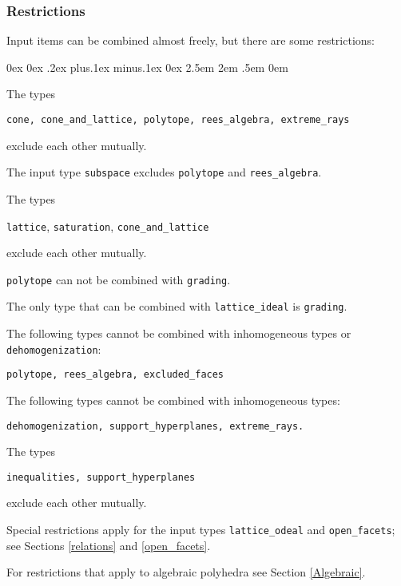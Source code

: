\documentclass[12pt,a4paper]{scrartcl}
\newcounter{listi}
\newcommand{\stdli}{ \topsep0ex \partopsep0ex %
\parsep.2ex plus.1ex minus.1ex \itemsep0ex%
\leftmargin2.5em \labelwidth2em \labelsep.5em \rightmargin0em}%
\newenvironment{arab}{\begin{list}{\textup{(\arabic{listi})}}%
	{\usecounter{listi}\stdli}}{\end{list}}
\theoremstyle{definition}
\def\ttt{\texttt}
\begin{document}
\subsubsection{Restrictions}

Input items can be combined almost freely, but there are some restrictions:

\begin{arab}
	\item The types
	\begin{center}
		\ttt {cone, cone\_and\_lattice, polytope, rees\_algebra, extreme\_rays}	
	\end{center}
	exclude each other mutually.
	\item The input type \verb|subspace| excludes \verb|polytope| and \verb|rees_algebra|.
	\item The types
	\begin{center}
		\ttt {lattice}, \ttt{saturation}, \ttt{cone\_and\_lattice}	
	\end{center}
	exclude each other mutually.
	\item \verb|polytope| can not be combined with \verb|grading|.
	\item The only type that can be combined with \ttt{lattice\_ideal} is \ttt{grading}.
	\item The following types cannot be combined with inhomogeneous types or \verb|dehomogenization|:
	\begin{center}
		\ttt{polytope, rees\_algebra, excluded\_faces}
	\end{center}
	\item The following types cannot be combined with inhomogeneous types:
	\begin{center}
		\ttt{dehomogenization, support\_hyperplanes, extreme\_rays.}
	\end{center}

\item The types
\begin{center}
	\ttt{inequalities, support\_hyperplanes}
\end{center}
exclude each other mutually.
	
	\item Special restrictions apply for the input types \verb|lattice_odeal| and \verb|open_facets|; see Sections \ref{relations} and \ref{open_facets}.
	
	\item For restrictions that apply to algebraic polyhedra see Section \ref{Algebraic}.
\end{arab}
\end{document}
